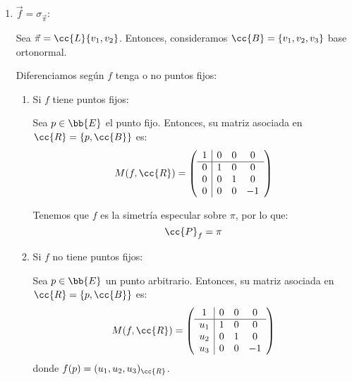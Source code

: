 \begin{enumerate}
    \item $\vec{f}=\sigma_{\vec{\pi}}$:

    Sea $\vec{\pi}=\cc{L}\{v_1, v_2\}$. Entonces, consideramos $\cc{B}=\{v_1,v_2,v_3\}$ base ortonormal. 

    Diferenciamos según $f$ tenga o no puntos fijos:
    \begin{enumerate}
        \item Si $f$ tiene puntos fijos:

        Sea $p\in \bb{E}$ el punto fijo. Entonces, su matriz asociada en $\cc{R}=\{p,\cc{B}\}$ es:
        \begin{equation*}
            M(f,\cc{R}) = \left(\begin{array}{c|ccc}
                1 & 0 & 0 & 0 \\ \hline
                0 & 1 & 0 & 0 \\
                0 & 0 & 1 & 0 \\
                0 & 0 & 0 & -1 \\
            \end{array}\right)
        \end{equation*}

        Tenemos que $f$ es la simetría especular sobre $\pi$, por lo que:
        \begin{equation*}
            \cc{P}_f = \pi
        \end{equation*}

        \item Si $f$ no tiene puntos fijos:

        Sea $p\in \bb{E}$ un punto arbitrario. Entonces, su matriz asociada en $\cc{R}=\{p,\cc{B}\}$ es:
        \begin{equation*}
            M(f,\cc{R}) = \left(\begin{array}{c|ccc}
                1 & 0 & 0 & 0 \\ \hline
                u_1 & 1 & 0 & 0 \\
                u_2 & 0 & 1 & 0 \\
                u_3 & 0 & 0 & -1 \\
            \end{array}\right)
        \end{equation*}
        donde $f(p)=(u_1,u_2,u_3)_{\cc{R}}$.


\end{enumerate}
\end{enumerate}
